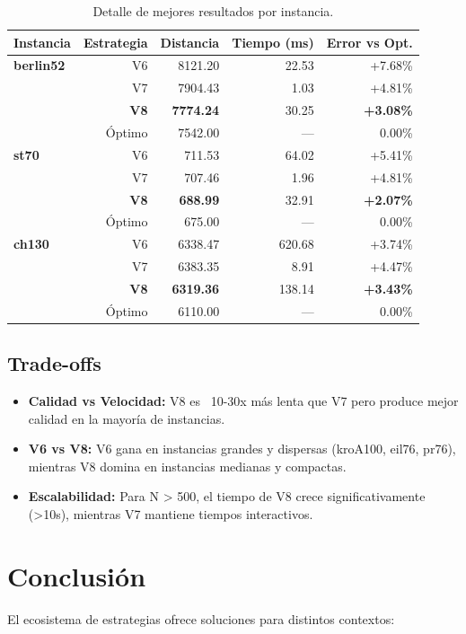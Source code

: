 \documentclass[12pt, a4paper]{article}
\begin{document}
\begin{table}[h]
    \centering
    \begin{tabular}{lrrrr}
        \toprule
        Instancia & Estrategia & Distancia & Tiempo (ms) & Error vs Opt. \\
        \midrule
        \textbf{berlin52} & V6 & 8121.20 & 22.53 & +7.68\% \\
        & V7 & 7904.43 & 1.03 & +4.81\% \\
        & \textbf{V8} & \textbf{7774.24} & 30.25 & \textbf{+3.08\%} \\
        & Óptimo & 7542.00 & --- & 0.00\% \\
        \midrule
        \textbf{st70} & V6 & 711.53 & 64.02 & +5.41\% \\
        & V7 & 707.46 & 1.96 & +4.81\% \\
        & \textbf{V8} & \textbf{688.99} & 32.91 & \textbf{+2.07\%} \\
        & Óptimo & 675.00 & --- & 0.00\% \\
        \midrule
        \textbf{ch130} & V6 & 6338.47 & 620.68 & +3.74\% \\
        & V7 & 6383.35 & 8.91 & +4.47\% \\
        & \textbf{V8} & \textbf{6319.36} & 138.14 & \textbf{+3.43\%} \\
        & Óptimo & 6110.00 & --- & 0.00\% \\
        \bottomrule
    \end{tabular}
    \caption{Detalle de mejores resultados por instancia.}
\end{table}

\subsection{Trade-offs}
\begin{itemize}
    \item \textbf{Calidad vs Velocidad:} V8 es ~10-30x más lenta que V7 pero produce mejor calidad en la mayoría de instancias.
    \item \textbf{V6 vs V8:} V6 gana en instancias grandes y dispersas (kroA100, eil76, pr76), mientras V8 domina en instancias medianas y compactas.
    \item \textbf{Escalabilidad:} Para N > 500, el tiempo de V8 crece significativamente (>10s), mientras V7 mantiene tiempos interactivos.
\end{itemize}

\section{Conclusión}
El ecosistema de estrategias ofrece soluciones para distintos contextos:
\end{document}
